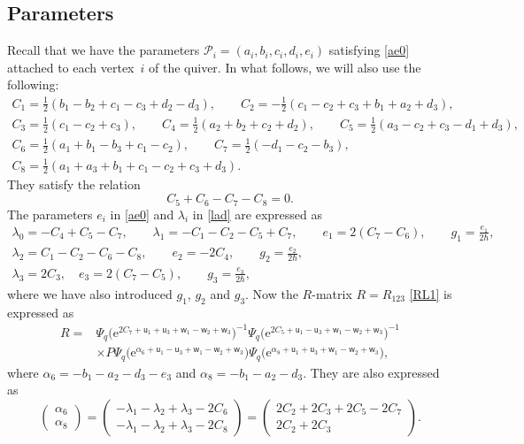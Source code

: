 \documentclass[pdftex]{sigma}
\newcommand{\e}{{\mathrm e}}
\newcommand{\uu}{{\mathsf u}}
\newcommand{\ww}{{\mathsf w}}
\numberwithin{equation}{section}
\begin{document}
\subsection{Parameters}\label{ss:para}
Recall that we have the parameters $\mathscr{P}_i=(a_i,b_i,c_i,d_i,e_i)$
satisfying \eqref{ae0} attached to each vertex~$i$ of the quiver.
In what follows, we will also use the following:
\begin{gather}
C_1 =\frac{1}{2}(b_1-b_2+c_1-c_3+d_2-d_3),
\qquad
C_2 = -\frac{1}{2}(c_1-c_2+c_3+b_1+a_2+d_3),\nonumber
\\
C_3 =\frac{1}{2}(c_1-c_2+c_3),
\qquad
C_4 = \frac{1}{2}(a_2+b_2+c_2+d_2),
\qquad
C_5 = \frac{1}{2}(a_3-c_2+c_3-d_1+d_3),\nonumber
\\
C_6 = \frac{1}{2}(a_1+b_1-b_3+c_1-c_2),
\qquad
C_7 = \frac{1}{2}(-d_1-c_2-b_3),\nonumber
\\
C_8 = \frac{1}{2}(a_1+a_3+b_1+c_1-c_2+c_3+d_3).\label{C8}
\end{gather}
They satisfy the relation
\begin{equation}\label{cz}
C_5+C_6-C_7-C_8=0.
\end{equation}
The parameters $e_i$ in \eqref{ae0} and $\lambda_i$ in \eqref{lad} are expressed as
\begin{gather}
\lambda_0 = -C_4+C_5-C_7,
\qquad
\lambda_1 = -C_1-C_2-C_5+C_7,
\qquad
e_1 = 2(C_7-C_6),
\qquad
g_1 = \frac{e_1}{2\hbar},\nonumber
\\
\lambda_2 = C_1-C_2-C_6-C_8,
\qquad
e_2 = -2C_4,
\qquad
g_2 = \frac{e_2}{2\hbar},\nonumber
\\
\lambda_3 = 2C_3,
\quad
e_3 = 2(C_7-C_5),
\qquad
g_3 = \frac{e_3}{2\hbar},\label{lac}
\end{gather}
where we have also introduced $g_1$, $g_2$ and $g_3$.
%
Now the $R$-matrix $R=R_{123}$ \eqref{RL1} is expressed as
\begin{align}
R ={}&\Psi_q\bigl(\e^{2C_7+\uu_1+\uu_3+\ww_1-\ww_2+\ww_3}\bigr)^{-1}
\Psi_q\bigl(\e^{2C_5+\uu_1-\uu_3+\ww_1-\ww_2+\ww_3}\bigr)^{-1}\nonumber
\\
& \times P
\Psi_q\bigl(\e^{\alpha_6+\uu_1-\uu_3+\ww_1-\ww_2+\ww_3}\bigr)
\Psi_q\bigl(\e^{\alpha_8+\uu_1+\uu_3+\ww_1-\ww_2+\ww_3}\bigr),\label{RL12}
\end{align}
where $\alpha_6= -b_1-a_2-d_3-e_3$ and
$\alpha_8 = -b_1-a_2-d_3$.
They are also expressed as
\begin{equation}\label{C68}
\begin{pmatrix}
\alpha_6
\\
\alpha_8
\end{pmatrix}
=
\begin{pmatrix}
-\lambda_1-\lambda_2+\lambda_3-2C_6
\\
-\lambda_1-\lambda_2+\lambda_3-2C_8
\end{pmatrix}
=
\begin{pmatrix}
2 C_2 + 2 C_3 + 2 C_5 - 2 C_7
\\
2 C_2 + 2 C_3
\end{pmatrix}.
\end{equation}
\end{document}
